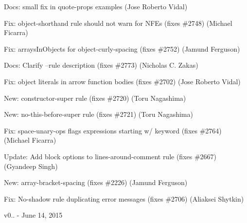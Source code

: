 \begin{DoxyItemize}
\item Docs\+: small fix in quote-\/props examples (Jose Roberto Vidal)
\item Fix\+: object-\/shorthand rule should not warn for N\+F\+Es (fixes \#2748) (Michael Ficarra)
\item Fix\+: arrays\+In\+Objects for object-\/curly-\/spacing (fixes \#2752) (Jamund Ferguson)
\item Docs\+: Clarify --rule description (fixes \#2773) (Nicholas C. Zakas)
\item Fix\+: object literals in arrow function bodies (fixes \#2702) (Jose Roberto Vidal)
\item New\+: {\ttfamily constructor-\/super} rule (fixes \#2720) (Toru Nagashima)
\item New\+: {\ttfamily no-\/this-\/before-\/super} rule (fixes \#2721) (Toru Nagashima)
\item Fix\+: space-\/unary-\/ops flags expressions starting w/ keyword (fixes \#2764) (Michael Ficarra)
\item Update\+: Add block options to {\ttfamily lines-\/around-\/comment} rule (fixes \#2667) (Gyandeep Singh)
\item New\+: array-\/bracket-\/spacing (fixes \#2226) (Jamund Ferguson)
\item Fix\+: No-\/shadow rule duplicating error messages (fixes \#2706) (Aliaksei Shytkin)
\end{DoxyItemize}

v0.. -\/ June 14, 2015


